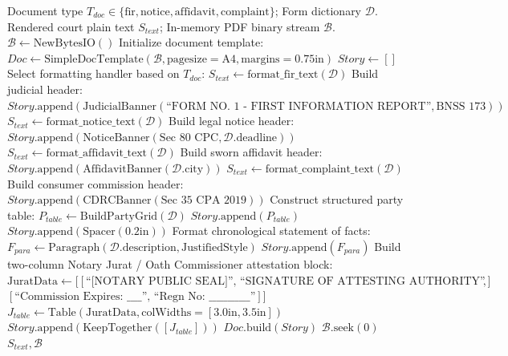 \begin{algorithm}[H]
\caption{Court-Ready Vector PDF Generation with Notary Jurat Flowables}
\label{alg:pdf_generation}
\begin{algorithmic}[1]
\Require Document type $T_{doc} \in \{\text{fir}, \text{notice}, \text{affidavit}, \text{complaint}\}$; Form dictionary $\mathcal{D}$.
\Ensure Rendered court plain text $S_{text}$; In-memory PDF binary stream $\mathcal{B}$.
\State $\mathcal{B} \leftarrow \text{NewBytesIO}()$
\State Initialize document template: $Doc \leftarrow \text{SimpleDocTemplate}(\mathcal{B}, \text{pagesize}=\text{A4}, \text{margins}=0.75\text{in})$
\State $Story \leftarrow []$
\State Select formatting handler based on $T_{doc}$:
    \State $S_{text} \leftarrow \text{format\_fir\_text}(\mathcal{D})$
    \State Build judicial header: $Story.\text{append}(\text{JudicialBanner}(\text{``FORM NO. 1 - FIRST INFORMATION REPORT''}, \text{BNSS 173}))$
    \State $S_{text} \leftarrow \text{format\_notice\_text}(\mathcal{D})$
    \State Build legal notice header: $Story.\text{append}(\text{NoticeBanner}(\text{Sec 80 CPC}, \mathcal{D}.\text{deadline}))$
    \State $S_{text} \leftarrow \text{format\_affidavit\_text}(\mathcal{D})$
    \State Build sworn affidavit header: $Story.\text{append}(\text{AffidavitBanner}(\mathcal{D}.\text{city}))$
    \State $S_{text} \leftarrow \text{format\_complaint\_text}(\mathcal{D})$
    \State Build consumer commission header: $Story.\text{append}(\text{CDRCBanner}(\text{Sec 35 CPA 2019}))$
\EndIf
\State Construct structured party table: $P_{table} \leftarrow \text{BuildPartyGrid}(\mathcal{D})$
\State $Story.\text{append}(P_{table})$
\State $Story.\text{append}(\text{Spacer}(0.2\text{in}))$
\State Format chronological statement of facts: $F_{para} \leftarrow \text{Paragraph}(\mathcal{D}.\text{description}, \text{JustifiedStyle})$
\State $Story.\text{append}(F_{para})$
\State Build two-column Notary Jurat / Oath Commissioner attestation block:
\State $\text{JuratData} \leftarrow [[\text{``[NOTARY PUBLIC SEAL]'', ``SIGNATURE OF ATTESTING AUTHORITY''}],$
\State \phantom{Build} \quad\quad $[\text{``Commission Expires: \_\_\_\_'', ``Regn No: \_\_\_\_\_\_\_\_\_\_\_''}]]$
\State $J_{table} \leftarrow \text{Table}(\text{JuratData}, \text{colWidths}=[3.0\text{in}, 3.5\text{in}])$
\State $Story.\text{append}(\text{KeepTogether}([J_{table}]))$
\State $Doc.\text{build}(Story)$
\State $\mathcal{B}.\text{seek}(0)$
\State \Return $S_{text}, \mathcal{B}$
\end{algorithmic}
\end{algorithm}

